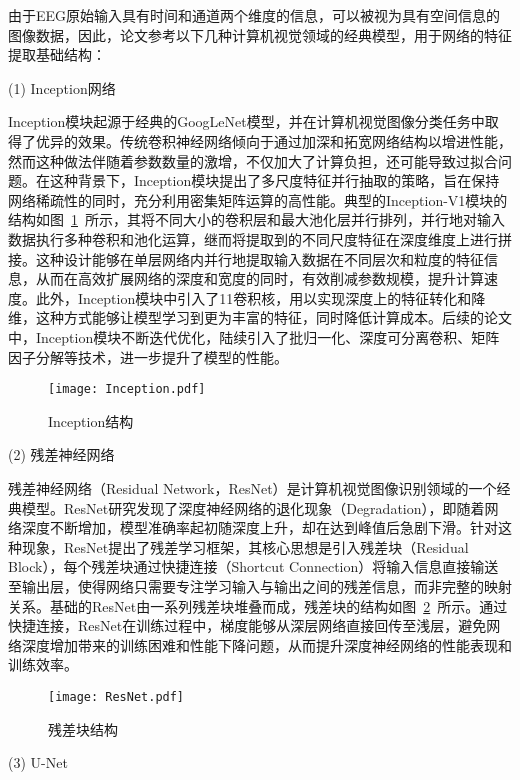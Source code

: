 由于EEG原始输入具有时间和通道两个维度的信息，可以被视为具有空间信息的图像数据，因此，论文参考以下几种计算机视觉领域的经典模型，用于网络的特征提取基础结构：

(1) Inception网络

Inception模块起源于经典的GoogLeNet模型\cite{szegedy2015going}，并在计算机视觉图像分类任务中取得了优异的效果。传统卷积神经网络倾向于通过加深和拓宽网络结构以增进性能，然而这种做法伴随着参数数量的激增，不仅加大了计算负担，还可能导致过拟合问题。在这种背景下，Inception模块提出了多尺度特征并行抽取的策略，旨在保持网络稀疏性的同时，充分利用密集矩阵运算的高性能。典型的Inception-V1模块的结构如图~\ref{fig:Inception}~所示，其将不同大小的卷积层和最大池化层并行排列，并行地对输入数据执行多种卷积和池化运算，继而将提取到的不同尺度特征在深度维度上进行拼接。这种设计能够在单层网络内并行地提取输入数据在不同层次和粒度的特征信息，从而在高效扩展网络的深度和宽度的同时，有效削减参数规模，提升计算速度。此外，Inception模块中引入了1\times1卷积核，用以实现深度上的特征转化和降维，这种方式能够让模型学习到更为丰富的特征，同时降低计算成本。后续的论文中，Inception模块不断迭代优化，陆续引入了批归一化、深度可分离卷积、矩阵因子分解等技术，进一步提升了模型的性能\cite{szegedy2016rethinking}\cite{szegedy2017inception}。
\begin{figure}
  \centering
  \texttt{[image: Inception.pdf]}
  \caption{Inception结构}
  \label{fig:Inception}
\end{figure}

(2) 残差神经网络

残差神经网络（Residual Network，ResNet）\cite{he2016deep}是计算机视觉图像识别领域的一个经典模型。ResNet研究发现了深度神经网络的退化现象（Degradation），即随着网络深度不断增加，模型准确率起初随深度上升，却在达到峰值后急剧下滑。针对这种现象，ResNet提出了残差学习框架，其核心思想是引入残差块（Residual Block），每个残差块通过快捷连接（Shortcut Connection）将输入信息直接输送至输出层，使得网络只需要专注学习输入与输出之间的残差信息，而非完整的映射关系。基础的ResNet由一系列残差块堆叠而成，残差块的结构如图~\ref{fig:ResNet}~所示。通过快捷连接，ResNet在训练过程中，梯度能够从深层网络直接回传至浅层，避免网络深度增加带来的训练困难和性能下降问题，从而提升深度神经网络的性能表现和训练效率。
\begin{figure}
  \centering
  \texttt{[image: ResNet.pdf]}
  \caption{残差块结构}
  \label{fig:ResNet}
\end{figure}

(3) U-Net


